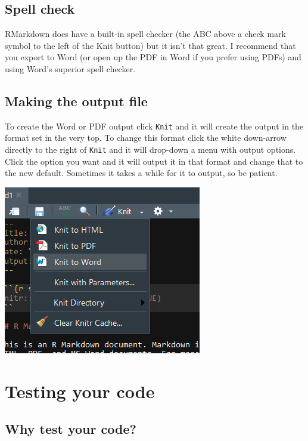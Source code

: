 \documentclass[
]{krantz}
\begin{document}
\hypertarget{spell-check}{%
\section{Spell check}\label{spell-check}}

RMarkdown does have a built-in spell checker (the ABC above a check mark symbol to the left of the Knit button) but it isn't that great. I recommend that you export to Word (or open up the PDF in Word if you prefer using PDFs) and using Word's superior spell checker.

\hypertarget{making-the-output-file}{%
\section{Making the output file}\label{making-the-output-file}}

To create the Word or PDF output click \texttt{Knit} and it will create the output in the format set in the very top. To change this format click the white down-arrow directly to the right of \texttt{Knit} and it will drop-down a menu with output options. Click the option you want and it will output it in that format and change that to the new default. Sometimes it takes a while for it to output, so be patient.

\includegraphics{images/markdown4.PNG}

\hypertarget{tests}{%
\chapter{Testing your code}\label{tests}}

\hypertarget{why-test-your-code}{%
\section{Why test your code?}\label{why-test-your-code}}
\end{document}

